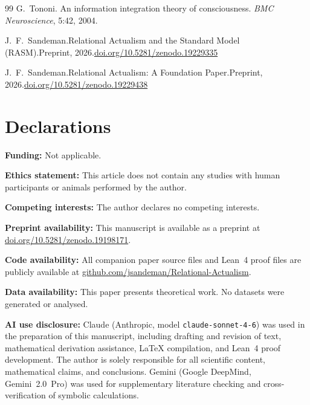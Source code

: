 \documentclass[11pt,a4paper]{article}
\theoremstyle{remark}
\begin{document}
\begin{thebibliography}{99}
G.~Tononi.
\newblock An information integration theory of consciousness.
\newblock \textit{BMC Neuroscience}, 5:42, 2004.

J.~F.~Sandeman.\newblock Relational Actualism and the Standard Model ({RASM}).\newblock Preprint, 2026.\newblock \href{https://doi.org/10.5281/zenodo.19229335}{doi.org/10.5281/zenodo.19229335}

J.~F.~Sandeman.\newblock Relational Actualism: A Foundation Paper.\newblock Preprint, 2026.\newblock \href{https://doi.org/10.5281/zenodo.19229438}{doi.org/10.5281/zenodo.19229438}

\end{thebibliography}

\section*{Declarations}
\textbf{Funding:} Not applicable.

\textbf{Ethics statement:} This article does not contain any studies with human participants or animals performed by the author.

\quad
\textbf{Competing interests:} The author declares no competing interests.

\textbf{Preprint availability:} This manuscript is available as a preprint at
\href{https://doi.org/10.5281/zenodo.19198171}{doi.org/10.5281/zenodo.19198171}.

\textbf{Code availability:} All companion paper source files and Lean~4 proof files are publicly available at \href{https://github.com/jsandeman/Relational-Actualism}{github.com/jsandeman/Relational-Actualism}.

\textbf{Data availability:} This paper presents theoretical work. No datasets
were generated or analysed.

\textbf{AI use disclosure:} Claude (Anthropic, model \texttt{claude-sonnet-4-6}) was used in the preparation of this manuscript, including drafting and revision of text, mathematical derivation assistance, \LaTeX{} compilation, and Lean~4 proof development. The author is solely responsible for all scientific content, mathematical claims, and conclusions. Gemini (Google DeepMind, Gemini~2.0~Pro) was used for supplementary literature checking and cross-verification of symbolic calculations.
\end{document}

